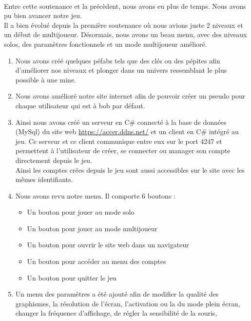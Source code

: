 \documentclass[titlepage, 13px, a4paper]{report}
\begin{document}
\paragraph{} \hspace{0pt} 
Entre cette soutenance et la précèdent, nous avons eu plus de temps. Nous avons pu bien avancer notre jeu. \\
Il a bien évolué depuis la première soutenance où nous avions juste 2 niveaux et un début de multijoueur.
Désormais, nous avons un beau menu, avec des niveaux solos, des paramètres fonctionnels et un mode multijoueur amélioré.

{\begin{enumerate}
	\item Nous avons créé quelques péfabs tels que des clés ou des pépites afin d’améliorer nos niveaux 
			et plonger dans un univers ressemblant le plus possible à une mine.	\\
	\item Nous avons amélioré notre site internet afin de pouvoir créer un pseudo pour chaque utilisateur qui est à bob par défaut.	\\
	\item Ainsi nous avons créé un serveur en C\# connecté à la base de données (MySql) du site web \url{https://accer.ddns.net/}
			et un client en C\# intégré au jeu. 
			Ce serveur et ce client communique entre eux sur le port 4247 et permettent à l’utilisateur de créer, se connecter ou
			manager son compte directement depuis le jeu. \\
			Ainsi les comptes crées depuis le jeu sont aussi accessibles sur le site avec les mêmes identifiants. \\
	\item Nous avons revu notre menu. Il comporte 6 boutons :
		{\begin{itemize}
			\item	Un bouton pour jouer au mode solo
			\item	Un bouton pour jouer au mode multijoueur
			\item	Un bouton pour ouvrir le site web dans un navigateur
			\item	Un bouton pour accéder au menu des comptes
			\item	Un bouton pour quitter le jeu \\
		\end{itemize}} 
	\item Un menu des paramètres a été ajouté afin de modifier la qualité des graphismes, la résolution de l’écran, 
		l’activation ou la du mode plein écran, changer la fréquence d’affichage, de régler la sensibilité de la souris, 

\end{enumerate}}
\end{document}
